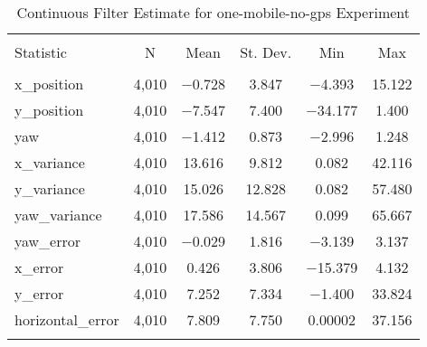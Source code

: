 
\begin{table}[h] \centering 
  \caption{Continuous Filter Estimate for one-mobile-no-gps Experiment} 
  \label{tab:one_mobile_no_gps_continuous_summary} 
\begin{tabular}{@{\extracolsep{5pt}}lccccc} 
\\[-1.8ex]\hline 
\hline \\[-1.8ex] 
Statistic & \multicolumn{1}{c}{N} & \multicolumn{1}{c}{Mean} & \multicolumn{1}{c}{St. Dev.} & \multicolumn{1}{c}{Min} & \multicolumn{1}{c}{Max} \\ 
\hline \\[-1.8ex] 
x\_position & 4,010 & $-$0.728 & 3.847 & $-$4.393 & 15.122 \\ 
y\_position & 4,010 & $-$7.547 & 7.400 & $-$34.177 & 1.400 \\ 
yaw & 4,010 & $-$1.412 & 0.873 & $-$2.996 & 1.248 \\ 
x\_variance & 4,010 & 13.616 & 9.812 & 0.082 & 42.116 \\ 
y\_variance & 4,010 & 15.026 & 12.828 & 0.082 & 57.480 \\ 
yaw\_variance & 4,010 & 17.586 & 14.567 & 0.099 & 65.667 \\ 
yaw\_error & 4,010 & $-$0.029 & 1.816 & $-$3.139 & 3.137 \\ 
x\_error & 4,010 & 0.426 & 3.806 & $-$15.379 & 4.132 \\ 
y\_error & 4,010 & 7.252 & 7.334 & $-$1.400 & 33.824 \\ 
horizontal\_error & 4,010 & 7.809 & 7.750 & 0.00002 & 37.156 \\ 
\hline \\[-1.8ex] 
\end{tabular} 
\end{table} 
